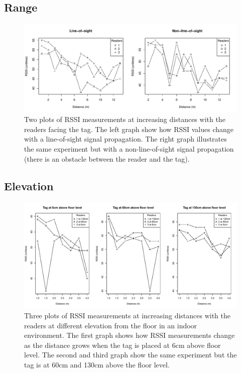 \subsection{Range}

\begin{figure}[H]
	\begin{center}
		\includegraphics[width=1\textwidth]{figures/rssi_distance_13m}
		\caption{Two plots of RSSI measurements at increasing distances with the readers facing the tag. The left graph show how RSSI values change with a line-of-sight signal propagation. The right graph illustrates the same experiment but with a non-line-of-sight signal propagation (there is an obstacle between the reader and the tag).}
	\end{center}
\end{figure}

\subsection{Elevation}

\begin{figure}[H]
	\begin{center}
		\includegraphics[width=1\textwidth]{figures/rssi_distance_4m}
		\caption{Three plots of RSSI measurements at increasing distances with the readers at different elevation from the floor in an indoor environment. The first graph shows how RSSI measurements change as the distance grows when the tag is placed at 6cm above floor level. The second and third graph show the same experiment but the tag is at 60cm and 130cm above the floor level.}
	\end{center}
\end{figure}

